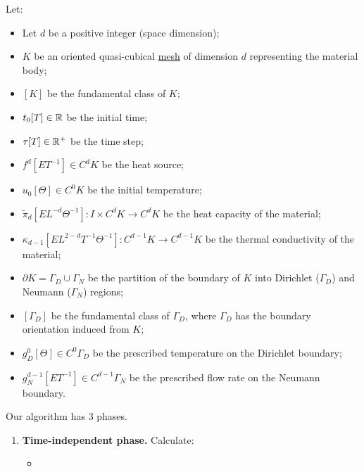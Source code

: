 \begin{algorithm}
  \label{cmc/diffusion/discrete/transient/mixed_weak_solve_trapezoidal-algorithm}
  Let:
  \begin{itemize}
    \item
      Let $d$ be a positive integer (space dimension);
    \item
      $K$ be an oriented quasi-cubical \hyperref[cmc:mesh:definition]{mesh} of
      dimension $d$ representing the material body;
    \item
      $[K]$ be the fundamental class of $K$;
    \item
      $t_0 [T] \in \mathbb{R}$ be the initial time;
    \item
      $\tau [T] \in \mathbb{R}^+$ be the time step;
    \item
      $f^d [E T^{-1}] \in C^d K$ be the heat source;
    \item
      $u_0 [\Theta] \in C^0 K$ be the initial temperature;
    \item
      $\tilde{\pi}_d [E L^{-d} \Theta^{-1}] \colon I \times C^d K \to C^d K$
      be the heat capacity of the material;
    \item
      $\kappa_{d - 1} [E L^{2 - d} T^{-1} \Theta^{-1}]
        \colon C^{d - 1} K \to C^{d - 1} K$
      be the thermal conductivity of the material;
    \item
      $\partial K = \Gamma_D \cup \Gamma_N$ be the partition of the boundary of
      $K$ into Dirichlet ($\Gamma_D$) and Neumann ($\Gamma_N$) regions;
    \item
      $[\Gamma_D]$ be the fundamental class of $\Gamma_D$, where $\Gamma_D$
      has the boundary orientation induced from $K$;
    \item
      $g_D^0 [\Theta] \in C^0 \Gamma_D$
      be the prescribed temperature on the Dirichlet boundary;
    \item
      $g_N^{d - 1} [E T^{-1}] \in C^{d - 1} \Gamma_N$
      be the prescribed flow rate on the Neumann boundary.
  \end{itemize}
  Our algorithm has $3$ phases.
  \begin{enumerate}
    \item
      \textbf{Time-independent phase.}
      Calculate:
      \begin{itemize}
        \item

\end{itemize}
\end{enumerate}
\end{algorithm}
